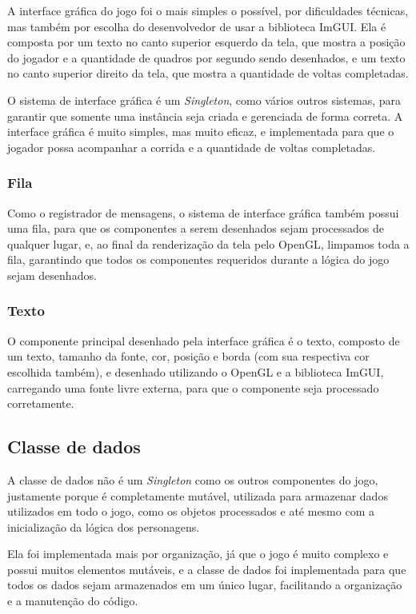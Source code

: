 A interface gráfica do jogo foi o mais simples o possível, por dificuldades técnicas, mas também por escolha do desenvolvedor de usar a biblioteca ImGUI. Ela é composta por um texto no canto superior esquerdo da tela, que mostra a posição do jogador e a quantidade de quadros por segundo sendo desenhados, e um texto no canto superior direito da tela, que mostra a quantidade de voltas completadas.

O sistema de interface gráfica é um \textit{Singleton}, como vários outros sistemas, para garantir que somente uma instância seja criada e gerenciada de forma correta. A interface gráfica é muito simples, mas muito eficaz, e implementada para que o jogador possa acompanhar a corrida e a quantidade de voltas completadas.

\subsubsection{Fila}
Como o registrador de mensagens, o sistema de interface gráfica também possui uma fila, para que os componentes a serem desenhados sejam processados de qualquer lugar, e, ao final da renderização da tela pelo OpenGL, limpamos toda a fila, garantindo que todos os componentes requeridos durante a lógica do jogo sejam desenhados.

\subsubsection{Texto}

O componente principal desenhado pela interface gráfica é o texto, composto de um texto, tamanho da fonte, cor, posição e borda (com sua respectiva cor escolhida também), e desenhado utilizando o OpenGL e a biblioteca ImGUI, carregando uma fonte livre externa, para que o componente seja processado corretamente.

\subsection{Classe de dados}

A classe de dados não é um \textit{Singleton} como os outros componentes do jogo, justamente porque é completamente mutável, utilizada para armazenar dados utilizados em todo o jogo, como os objetos processados e até mesmo com a inicialização da lógica dos personagens.

Ela foi implementada mais por organização, já que o jogo é muito complexo e possui muitos elementos mutáveis, e a classe de dados foi implementada para que todos os dados sejam armazenados em um único lugar, facilitando a organização e a manutenção do código.

